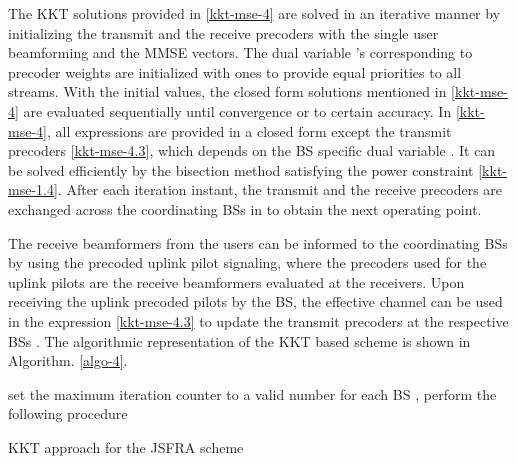 The \ac{KKT} solutions provided in \eqref{kkt-mse-4} are solved in an iterative manner by initializing the transmit and the receive precoders  with the single user beamforming and the \ac{MMSE} vectors. The dual variable \me{\alpha}'s corresponding to precoder weights are initialized with ones to provide equal priorities to all streams. With the initial values, the closed form solutions mentioned in \eqref{kkt-mse-4} are evaluated sequentially until convergence or to certain accuracy. In \eqref{kkt-mse-4}, all expressions are provided in a closed form except the transmit precoders \eqref{kkt-mse-4.3}, which depends on the \ac{BS} specific dual variable . It can be solved efficiently by the bisection method satisfying the power constraint \eqref{kkt-mse-1.4}. After each iteration instant, the transmit and the receive precoders are exchanged across the coordinating \acp{BS} in  to obtain the next operating point.

The receive beamformers from the users can be informed to the coordinating \acp{BS} by using the precoded uplink pilot signaling, where the precoders used for the uplink pilots are the receive beamformers  evaluated at the receivers. Upon receiving the uplink precoded pilots by the \ac{BS}, the effective channel  can be used in the expression \eqref{kkt-mse-4.3} to update the transmit precoders at the respective \acp{BS} \cite{komulainen2013effective}. The algorithmic representation of the \ac{KKT} based scheme is shown in Algorithm. \ref{algo-4}.
\begin{algorithm}
 \SetAlgoLined
 \DontPrintSemicolon
 \BlankLine
 set the maximum iteration counter  to a valid number \;
 for each \ac{BS} , perform the following procedure \;
 \caption{\ac{KKT} approach for the \ac{JSFRA} scheme}
  \label{algo-4}
\end{algorithm}
